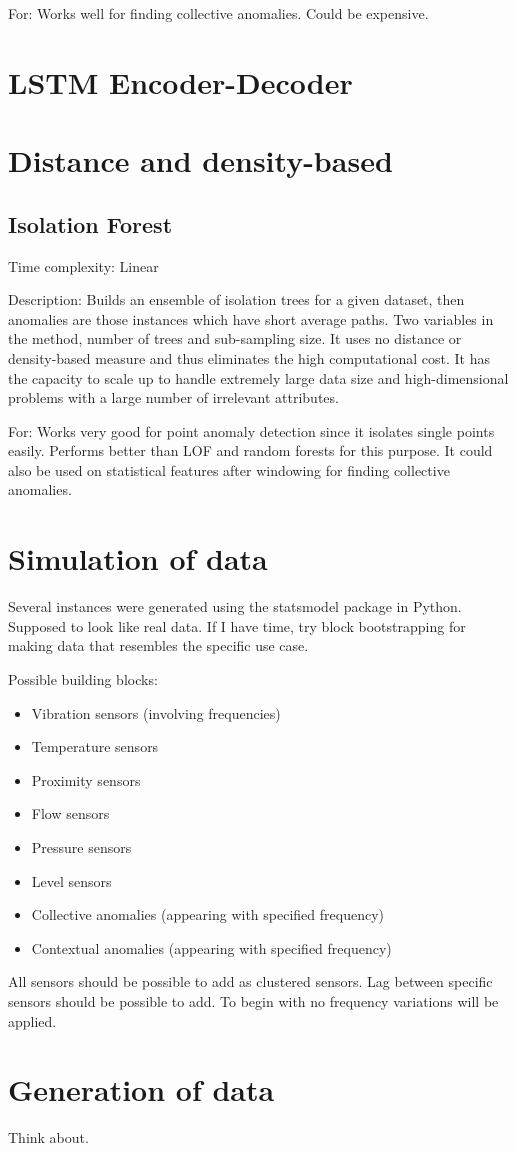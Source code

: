 For:
Works well for finding collective anomalies. Could be expensive.

\section{LSTM Encoder-Decoder}





\section{Distance and density-based}

\subsection{Isolation Forest }

Time complexity: 
Linear

Description: 
Builds an ensemble of isolation trees for a given dataset, then anomalies are those instances which have short average paths. Two variables in the method, number of trees and sub-sampling size. It uses no distance or density-based measure and thus eliminates the high computational cost. It has the capacity to scale up to handle extremely large data size and high-dimensional problems with a large number of irrelevant attributes. 

For: 
Works very good for point anomaly detection since it isolates single points easily. Performs better than LOF and random forests for this purpose. It could also be used on statistical features after windowing for finding collective anomalies.

\section{Simulation of data}
Several instances were generated using the statsmodel package in Python. 
Supposed to look like real data. If I have time, try block bootstrapping for making data that resembles the specific use case.

Possible building blocks:
\begin{itemize}
\item Vibration sensors (involving frequencies)
\item Temperature sensors 
\item Proximity sensors
\item Flow sensors
\item Pressure sensors
\item Level sensors
\item Collective anomalies (appearing with specified frequency)
\item Contextual anomalies (appearing with specified frequency)
\end{itemize}
All sensors should be possible to add as clustered sensors. Lag between specific sensors should be possible to add. To begin with no frequency variations will be applied. 

\section{Generation of data}
Think about.


